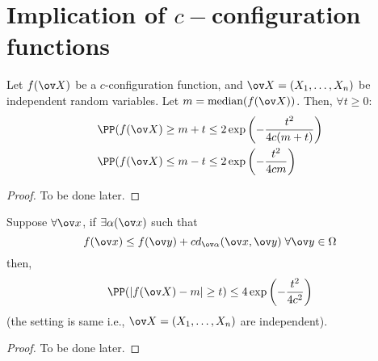 \section{Implication of $c-$configuration functions}
\begin{theorem}\label{thm:config-median}
Let $f(\ov X)$ be a $c$-configuration function, and $\ov X = (X_1, \dots, X_n)$ be independent random variables. Let $m = \text{median}(f(\ov X))$. Then, $\forall t \geq 0$:
\begin{equation}
\begin{split}
    \PP(f(\ov X )\geq m + t &\leq 2 \exp\left(-\frac{t^2}{4c(m+t)}\right) \\
    \PP(f(\ov X) \leq m - t &\leq 2 \exp\left(-\frac{t^2}{4cm}\right)
\end{split}
\end{equation}
\end{theorem}
\begin{proof}
To be done later.
\end{proof}
\begin{theorem}
Suppose $\forall \ov x$, if $\exists \alpha (\ov x)$ such that
\[
f(\ov x) \leq f(\ov y) + c d_{\ov \alpha}(\ov x, \ov y) \; \forall \ov y \in \Omega
\]
then,
\begin{equation}
    \PP(|f(\ov X) - m| \geq t) \leq 4\exp\left(-\frac{t^2}{4c^2}\right)
\end{equation}
(the setting is same i.e., $\ov X = (X_1, \dots, X_n)$ are independent).
\end{theorem}
\begin{proof}
To be done later.
\end{proof}
